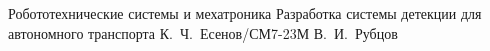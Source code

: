 \documentclass{bmstu}
\begin{document}
                {Робототехнические системы и мехатроника}                       %
                {Разработка системы детекции для автономного транспорта}                                                              %
                {К.~Ч.~Есенов/СМ7-23М}                                          %
                {В.~И.~Рубцов}                                                 %
                {}                                                              %
\end{document}
